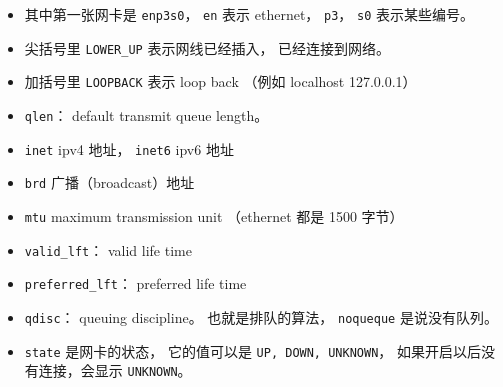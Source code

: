 \begin{itemize}
\item 其中第一张网卡是 \verb|enp3s0|， \verb|en| 表示 ethernet， \verb|p3|， \verb|s0| 表示某些编号。
\item 尖括号里 \verb|LOWER_UP| 表示网线已经插入， 已经连接到网络。
\item 加括号里 \verb|LOOPBACK| 表示 loop back （例如 localhost 127.0.0.1）
\item \verb|qlen|： default transmit queue length。
\item \verb|inet| ipv4 地址， \verb|inet6| ipv6 地址
\item \verb|brd| 广播（broadcast）地址
\item \verb|mtu| maximum transmission unit （ethernet 都是 1500 字节）
\item \verb|valid_lft|： valid life time
\item \verb|preferred_lft|： preferred life time
\item \verb|qdisc|： queuing discipline。 也就是排队的算法， \verb|noqueque| 是说没有队列。
\item \verb|state| 是网卡的状态， 它的值可以是 \verb|UP, DOWN, UNKNOWN|， 如果开启以后没有连接，会显示 \verb|UNKNOWN|。
\end{itemize}


